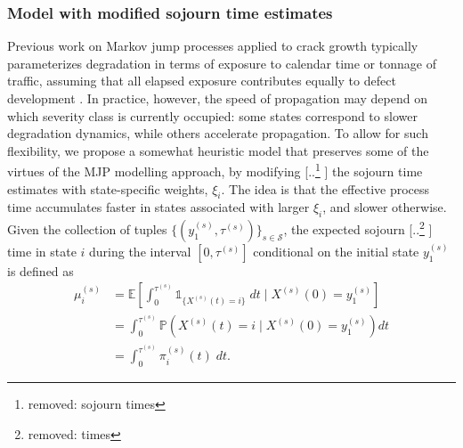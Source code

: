 \documentclass{article}
\providecommand{\DIFadd}[1]{{\protect\color{blue} \sf #1}} %
\providecommand{\DIFdel}[1]{{\protect\color{red} [..\footnote{removed: #1} ]}} %
\providecommand{\DIFaddbegin}{} %
\providecommand{\DIFaddend}{} %
\providecommand{\DIFdelbegin}{} %
\providecommand{\DIFdelend}{} %
\begin{document}
\DIFdelend \subsubsection{Model with modified sojourn time estimates} \label{sec:warping}
Previous work on Markov jump processes applied to crack growth typically parameterizes degradation in terms of exposure to calendar time or tonnage of traffic, assuming that all elapsed exposure contributes equally to defect development \citep{bisgaard2024A}. 
In practice, however, the speed of propagation may depend on which severity class is currently occupied: some states correspond to slower degradation dynamics, while others accelerate propagation.
To allow for such flexibility, we propose a somewhat heuristic model that preserves some of the virtues of the MJP modelling approach, by modifying \DIFdelbegin \DIFdel{sojourn times }\DIFdelend \DIFaddbegin \DIFadd{the sojourn time }\DIFaddend estimates with state-specific weights, $\xi_i$.
The idea is that the effective process time accumulates faster in states associated with larger $\xi_i$, and slower otherwise.
Given the collection of tuples $\{ ( y_1^{(s)}, \tau^{(s)} ) \}_{s \in \mathcal{S}}$, the expected sojourn \DIFdelbegin \DIFdel{times }\DIFdelend \DIFaddbegin \DIFadd{time }\DIFaddend in state $i$ during the interval $\left[ 0,\tau^{(s)} \right]$ conditional on the initial state $y_1^{(s)}$ is defined as
\DIFdelbegin %
\DIFdelend \DIFaddbegin \begin{equation*}
    \begin{aligned}
    \mu_i^{(s)} &=\mathbb{E} \left[ \left. \int_0^{\tau^{(s)}} \mathds{1}_{\{X^{(s)}(t) = i\}} \; dt \; \Big| \; X^{(s)}(0) = y_1^{(s)} \right. \right] \\ 
				&= \int_0^{\tau^{(s)}}\mathds{P}\left(X^{(s)}(t)=i \; \Big| \; X^{(s)}(0)=y_1^{(s)}\right)dt \\ 
				&= \int_0^{\tau^{(s)}} \pi^{(s)}_i(t) \; dt.
\end{aligned}  \label{eq:cumulative_sojourn_time}
\end{equation*}\DIFaddend  
\end{document}
